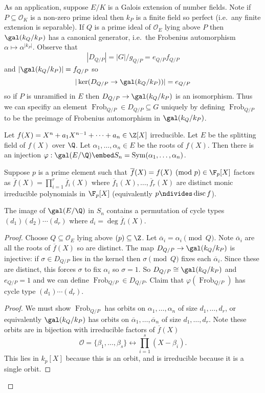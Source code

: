 \documentclass[a4paper]{article}
\renewcommand*{\O}{\mathcal{O}}
\DeclareMathOperator{\Frob}{Frob} %
\begin{document}
As an application, suppose \(E/K\) is a Galois extension of number fields. Note if \(P \subseteq \O_K\) is a non-zero prime ideal then \(k_P\) is a finite field so perfect (i.e.\ any finite extension is separable). If \(Q\) is a prime ideal of \(\O_E\) lying above \(P\) then \(\gal(k_Q/k_P)\) has a canonical generator, i.e.\ the Frobenius automorphism \(\alpha \mapsto \alpha^{|k_P|}\). Observe that
\[
  |D_{Q/P}| = |G|/g_{Q/P} = e_{Q/P} f_{Q/P}
\]
and \(|\gal(k_Q/k_P)| = f_{Q/P}\) so
\[
  |\ker (D_{Q/P} \to \gal(k_Q/k_P))| = e_{Q/P}
\]
so if \(P\) is unramified in \(E\) then \(D_{Q/P} \to \gal(k_Q/k_P)\) is an isomorphism. Thus we can specifiy an element \(\Frob_{Q/P} \in D_{Q/P} \subseteq G\) uniquely by defining \(\Frob_{Q/P}\) to be the preimage of Frobenius automorphism in \(\gal(k_Q/k_P)\).

\begin{eg}
  Let \(f(X) = X^n + a_1X^{n - 1} + \dots + a_n \in \Z[X]\) irreducible. Let \(E\) be the splitting field of \(f(X)\) over \(\Q\). Let \(\alpha_1, \dots, \alpha_n \in E\) be the roots of \(f(X)\). Then there is an injection \(\varphi: \gal(E/\Q) \embed S_n = \operatorname{Sym}(\alpha_1, \dots, \alpha_n)\).

  Suppose \(p\) is a prime element such that \(\overline f(X) = f(X) \pmod p \in \F_p[X]\) factors as \(\overline f(X) = \prod_{i = 1}^r \overline f_i(X)\) where \(\overline f_1(X), \dots, \overline f_r(X)\) are distinct monic irreducible polynomials in \(\F_p[X]\) (equivalently \(p \ndivides \operatorname{disc} f\)).
\end{eg}

\begin{proposition}
  The image of \(\gal(E/\Q)\) in \(S_n\) contains a permutation of cycle types \((d_1) (d_2) \cdots (d_r)\) where \(d_i = \deg \overline f_i(X)\).
\end{proposition}

\begin{proof}
  Choose \(Q \subseteq \O_E\) lying above \((p) \subseteq \Z\). Let \(\overline \alpha_i = \alpha_i \pmod Q\). Note \(\overline \alpha_i\) are all the roots of \(\overline f(X)\) so are distinct. The map \(D_{Q/P} \to \gal(k_Q/k_P)\) is injective: if \(\sigma \in D_{Q/P}\) lies in the kernel then \(\sigma \pmod Q\) fixes each \(\overline \alpha_i\). Since these are distinct, this forces \(\sigma\) to fix \(\alpha_i\) so \(\sigma = 1\). So \(D_{Q/P} \cong \gal(k_Q/k_P)\) and \(e_{Q/P} = 1\) and we can define \(\Frob_{Q/P} \in D_{Q/P}\). Claim that \(\varphi(\Frob_{Q/P})\) has cycle type \((d_1) \cdots (d_r)\).

  \begin{proof}
    We must show \(\Frob_{Q/P}\) has orbits on \(\alpha_1, \dots, \alpha_n\) of size \(d_1, \dots, d_r\), or equivalently \(\gal(k_Q/k_P)\) has orbits on \(\overline \alpha_1, \dots, \overline \alpha_n\) of size \(d_1, \dots, d_r\). Note these orbits are in bijection with irreducible factors of \(\overline f(X)\)
    \[
      \O = \{\beta_1, \dots, \beta_s\} \longleftrightarrow \prod_{i = 1}^s(X - \beta_i).
    \]
    This lies in \(k_p[X]\) because this is an orbit, and is irreducible because it is a single orbit.
  \end{proof}
\end{proof}
\end{document}
